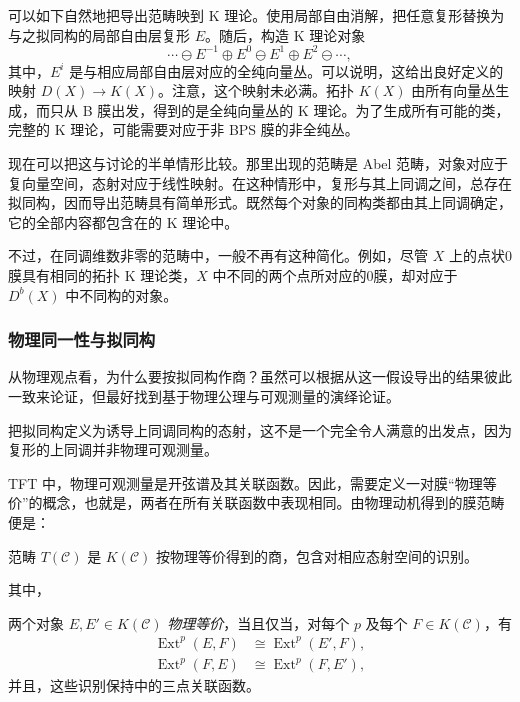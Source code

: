 可以如下自然地把导出范畴映到 K 理论。使用局部自由消解，把任意复形替换为与之拟同构的局部自由层复形 $E$。随后，构造 K 理论对象
\begin{equation}\label{eq:5.56}
\cdots\ominus E^{-1}\oplus E^0\ominus E^1\oplus E^2\ominus\cdots,
\end{equation}
其中，$E^i$ 是与相应局部自由层对应的全纯向量丛。可以说明，这给出良好定义的映射 $D(X)\to K(X)$。注意，这个映射未必满。拓扑 $K(X)$ 由所有向量丛生成，而只从 B 膜出发，得到的是全纯向量丛的 K 理论。为了生成所有可能的类，完整的 K 理论，可能需要对应于非 BPS 膜的非全纯丛。

现在可以把这与讨论的半单情形比较。那里出现的范畴是 Abel 范畴，对象对应于复向量空间，态射对应于线性映射。在这种情形中，复形与其上同调之间，总存在拟同构，因而导出范畴具有简单形式。既然每个对象的同构类都由其上同调确定，它的全部内容都包含在的 K 理论中。

不过，在同调维数非零的范畴中，一般不再有这种简化。例如，尽管 $X$ 上的点状0膜具有相同的拓扑 K 理论类，$X$ 中不同的两个点所对应的0膜，却对应于 $D^b(X)$ 中不同构的对象。

\subsubsection{物理同一性与拟同构}\label{sec:5.3.3.2}

从物理观点看，为什么要按拟同构作商？虽然可以根据从这一假设导出的结果彼此一致来论证，但最好找到基于物理公理与可观测量的演绎论证。

把拟同构定义为诱导上同调同构的态射，这不是一个完全令人满意的出发点，因为复形的上同调并非物理可观测量。

TFT 中，物理可观测量是开弦谱及其关联函数。因此，需要定义一对膜“物理等价”的概念，也就是，两者在所有关联函数中表现相同。由物理动机得到的膜范畴便是：
\begin{definition}\label{def:5.12}
范畴 $T(\mathcal{C})$ 是 $K(\mathcal{C})$ 按物理等价得到的商，包含对相应态射空间的识别。
\end{definition}
其中，
\begin{definition}\label{def:5.13}
两个对象 $E,E'\in K(\mathcal{C})$ \emph{物理等价}，当且仅当，对每个 $p$ 及每个 $F\in K(\mathcal{C})$，有
\begin{equation}\label{eq:5.57}
\begin{aligned}
\operatorname{Ext}^p(E,F)&\cong\operatorname{Ext}^p(E',F),\\
\operatorname{Ext}^p(F,E)&\cong\operatorname{Ext}^p(F,E'),
\end{aligned}
\end{equation}
并且，这些识别保持中的三点关联函数。
\end{definition}

